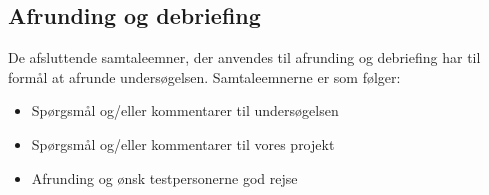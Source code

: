 \subsection{Afrunding og debriefing} 
\label{ParametreAfrundingDebriefing}
%
De afsluttende samtaleemner, der anvendes til afrunding og debriefing har til formål at afrunde undersøgelsen. Samtaleemnerne er som følger: \blankline
%
\begin{itemize}
\item Spørgsmål og/eller kommentarer til undersøgelsen 
\item Spørgsmål og/eller kommentarer til vores projekt
\item Afrunding og ønsk testpersonerne god rejse
\end{itemize}

